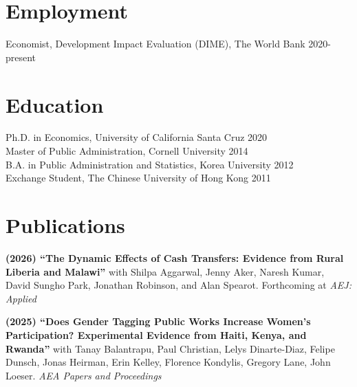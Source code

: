 \documentclass[letterpaper, margin, 10pt]{res} %
\begin{document}
\begin{resume}


 




%


\section{\sc \textbf{Employment}}
Economist, Development Impact Evaluation (DIME), The World Bank \hfill{2020-present}

\section{\sc \textbf{Education}}
{Ph.D. in Economics, University of California Santa Cruz} \hfill 2020\\
{Master of Public Administration, Cornell University} \hfill 2014\\
{B.A. in Public Administration and Statistics, Korea University} \hfill 2012\\
{ Exchange Student, The Chinese University of Hong Kong} \hfill 2011




\normalsize\section{\textbf{Publications}}
\normalsize


{\bf (2026) ``{The Dynamic Effects of Cash Transfers: Evidence from Rural Liberia and Malawi}''}
with Shilpa Aggarwal, Jenny Aker, Naresh Kumar, David Sungho Park, Jonathan Robinson, and Alan Spearot. Forthcoming at \textit{AEJ: Applied}

{\bf (2025) ``{Does Gender Tagging Public Works Increase Women's Participation? Experimental Evidence from Haiti, Kenya, and Rwanda}''}
with Tanay Balantrapu, Paul Christian, Lelys Dinarte-Diaz, Felipe Dunsch, Jonas Heirman, Erin Kelley, Florence Kondylis, Gregory Lane, John Loeser. \textit{AEA Papers and Proceedings}


\end{resume}
\end{document}
